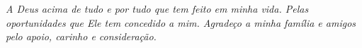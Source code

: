 \begin{agradecimentos}
\begin{vplace}[0.7]
\centering
\textit{A Deus acima de tudo e por tudo que tem feito em minha vida. Pelas oportunidades que Ele tem concedido a mim. Agradeço a minha família e amigos pelo apoio, carinho e consideração.}
\end{vplace}
\end{agradecimentos}
